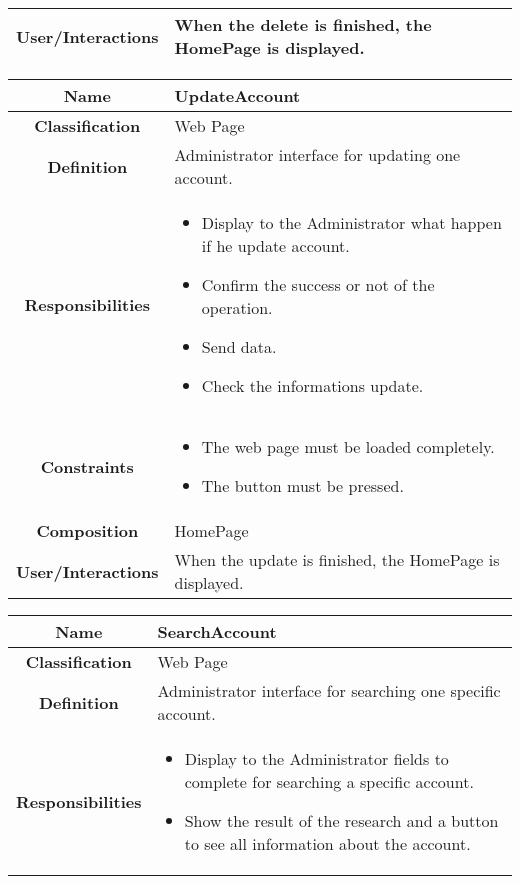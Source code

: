 \documentclass[11pt, a4paper,titlepage]{article}
\begin{document}
\begin{enumerate}
\begin{tabularx}{\textwidth}{| c | X |}
	\\
	\hline
	\textbf{User/Interactions} &
	When the delete is finished, the HomePage is displayed.
	\\
	\hline 
\end{tabularx}
\begin{tabularx}{\textwidth}{| c | X |}
	\hline
	\textbf{Name} &
	UpdateAccount
	\\
	\hline
	\textbf{Classification} &
	Web Page
	\\
	\hline
	\textbf{Definition} &
	Administrator interface for updating one account.\\
	\hline
	\textbf{Responsibilities} &
	\begin{itemize}
		\item Display to the Administrator what happen if he update account.
		\item Confirm the success or not of the operation.
		\item Send data.
		\item Check the informations update.
	\end{itemize}
	\\
	\hline
	\textbf{Constraints} &
	\begin{itemize}
		\item  The web page must be loaded completely.
		\item The button must be pressed.
	\end{itemize}
	\\
	\hline
	\textbf{Composition} & HomePage
	\\
	\hline
	\textbf{User/Interactions} &
	When the update is finished, the HomePage is displayed.
	\\
	\hline 
\end{tabularx}
\begin{tabularx}{\textwidth}{| c | X |}
	\hline
	\textbf{Name} &
	SearchAccount
	\\
	\hline
	\textbf{Classification} &
	Web Page
	\\
	\hline
	\textbf{Definition} &
	Administrator interface for searching one specific account.\\
	\hline
	\textbf{Responsibilities} &
	\begin{itemize}
		\item Display to the Administrator fields to complete for searching a specific account.
		\item Show the result of the research and a button to see all information about the account.
	\end{itemize}

\end{tabularx}
\end{enumerate}
\end{document}

